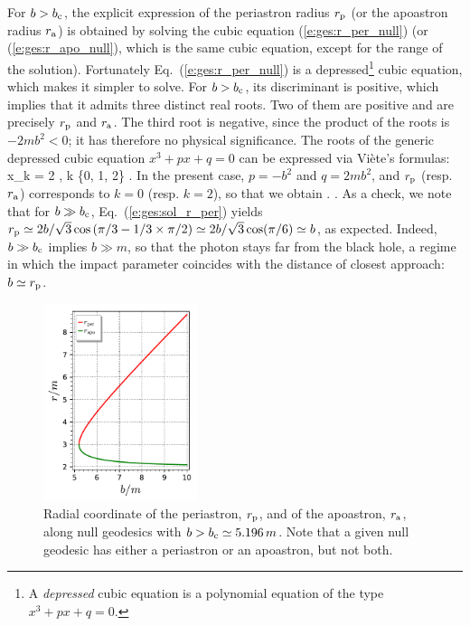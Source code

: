 For $b > b_{\rm c}$, the explicit expression of the periastron radius
$r_{\rm p}$ (or the apoastron radius $r_{\rm a}$)
is obtained by solving the cubic equation (\ref{e:ges:r_per_null})
(or (\ref{e:ges:r_apo_null}), which is the same cubic equation, except for
the range of the solution). Fortunately Eq.~(\ref{e:ges:r_per_null})
is a depressed\footnote{A \emph{depressed} cubic equation is a polynomial equation
of the type $x^3 + p x + q = 0$.} cubic equation, which makes
it simpler to solve. For $b > b_{\rm c}$, its discriminant is positive, which
implies that it admits three distinct real roots. Two of them are positive
and are precisely $r_{\rm p}$ and $r_{\rm a}$. The third root is negative,
since the product of the roots is $-2mb^2 < 0$; it has therefore no
physical significance. The roots of the generic depressed cubic
equation $x^3 + p x + q = 0$ can be expressed via Viète's formulas:
\be \label{e:gis:Viete}
    x_k = 2  \cos {},
        \qquad k \in \{0, 1, 2\} .
\ee
In the present case, $p= - b^2$ and $q = 2 m b^2$,
and $r_{\rm p}$ (resp. $r_{\rm a}$) corresponds to $k=0$
(resp. $k=2$), so that we obtain
\be \label{e:ges:sol_r_per}
  .
\ee
\be \label{e:ges:sol_r_apo}
   .
\ee
As a check, we note that for $b\gg b_{\rm c}$, Eq.~(\ref{e:ges:sol_r_per})
yields $r_{\rm p} \simeq 2b/\sqrt{3} \cos\left(\pi/3 -1/3 \times \pi/2 \right)
\simeq 2b/\sqrt{3} \cos(\pi/6) \simeq b$, as expected. Indeed, $b\gg b_{\rm c}$
implies $b \gg m$, so that the photon stays far from the black hole, a regime
in which the impact parameter coincides with the distance of closest approach:
$b \simeq r_{\rm p}$.

\begin{figure}
\centerline{\includegraphics[width=0.4\textwidth]{ges_null_per_apo.pdf}}
\caption[]{\label{f:gis:null_per_apo} \footnotesize
Radial coordinate of the periastron, $r_{\rm p}$, and of the apoastron,
$r_{\rm a}$, along null geodesics with $b > b_{\rm c} \simeq 5.196\, m$.
Note that a given null geodesic has either a periastron or an apoastron, but not
both.}
\end{figure}

